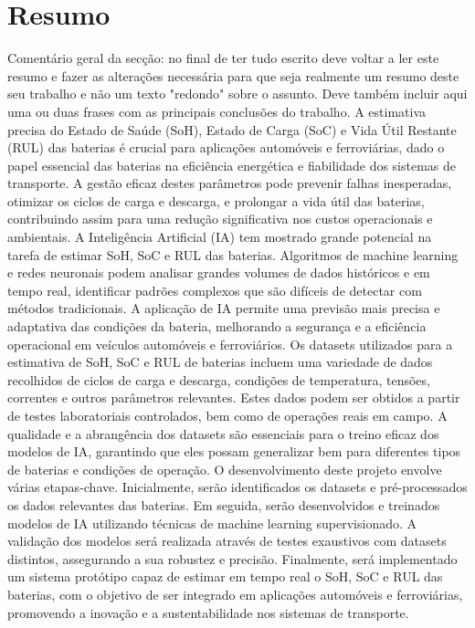 

\renewcommand{\abstractname}{Resumo}
\markboth{\spacedlowsmallcaps{\abstractname}}{\spacedlowsmallcaps{\abstractname}}
\addcontentsline{toc}{chapter}{\abstractname}


\begingroup
\let\clearpage\relax
\let\cleardoublepage\relax

\chapter*{Resumo}
\color{Red}
Comentário geral da secção: no final de ter tudo escrito deve voltar a ler este resumo e fazer as alterações necessária para que seja realmente um resumo deste seu trabalho e não um texto "redondo" sobre o assunto. Deve também incluir aqui uma ou duas frases com as principais conclusões do trabalho.
\color{Black}
\color{Red}
A estimativa precisa do Estado de Saúde (SoH), Estado de Carga (SoC) e Vida Útil Restante (RUL) das baterias é crucial para aplicações automóveis e ferroviárias, dado o papel essencial das baterias na eficiência energética e fiabilidade dos sistemas de transporte.
A gestão eficaz destes parâmetros pode prevenir falhas inesperadas, otimizar os ciclos de carga e descarga, e prolongar a vida útil das baterias, contribuindo assim para uma redução significativa nos custos operacionais e ambientais. 
A Inteligência Artificial (IA) tem mostrado grande potencial na tarefa de estimar SoH, SoC e RUL das baterias. Algoritmos de machine learning e redes neuronais podem analisar grandes volumes de dados históricos e em tempo real, identificar padrões complexos que são difíceis de detectar com métodos tradicionais. 
A aplicação de IA permite uma previsão mais precisa e adaptativa das condições da bateria, melhorando a segurança e a eficiência operacional em veículos automóveis e ferroviários. Os datasets utilizados para a estimativa de SoH, SoC e RUL de baterias incluem uma variedade de dados recolhidos de ciclos de carga e descarga, condições de temperatura, tensões, correntes e outros parâmetros relevantes. 
Estes dados podem ser obtidos a partir de testes laboratoriais controlados, bem como de operações reais em campo. A qualidade e a abrangência dos datasets são essenciais para o treino eficaz dos modelos de IA, garantindo que eles possam generalizar bem para diferentes tipos de baterias e condições de operação. O desenvolvimento deste projeto envolve várias etapas-chave. 
Inicialmente, serão identificados os datasets e pré-processados os dados relevantes das baterias. Em seguida, serão desenvolvidos e treinados modelos de IA utilizando técnicas de machine learning supervisionado. A validação dos modelos será realizada através de testes exaustivos com datasets distintos, assegurando a sua robustez e precisão. 
Finalmente, será implementado um sistema protótipo capaz de estimar em tempo real o SoH, SoC e RUL das baterias, com o objetivo de ser integrado em aplicações automóveis e ferroviárias, promovendo a inovação e a sustentabilidade nos sistemas de transporte.
\color{Black}


